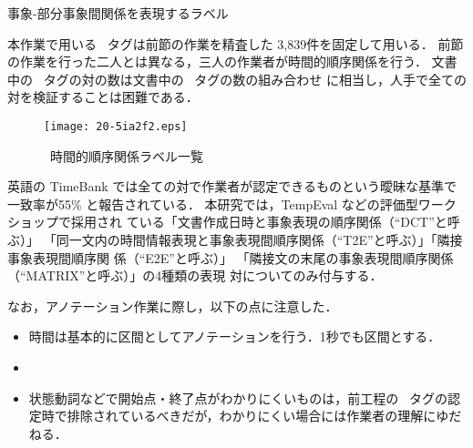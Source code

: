\documentclass[japanese]{jnlp_1.4}
\newcommand{\modified}[1]{}
\def\timexiii{}
\def\tlink{}
\def\event{}
\def\makeinstance{}
\begin{document}
\begin{table}[t]
\caption{事象-部分事象間関係を表現するラベル}
\label{table:subevent}

\end{table}

\modified{これらの計13+3+1種類のラベルを\timexiii\ タグと \makeinstance\ タグの間，もしくは，
二つの \makeinstance\ タグ間に付与する．}
本作業で用いる \makeinstance\ タグは前節の作業を精査した 3,839件を固定して用いる．
前節の作業を行った二人とは異なる，三人の作業者が時間的順序関係を行う．
文書中の \makeinstance\ タグの対の数は文書中の \makeinstance\ タグの数の組み合わせ
に相当し，人手で全ての対を検証することは困難である．

\begin{figure}[t]
\begin{center}
\texttt{[image: 20-5ia2f2.eps]}
\end{center}
\caption{\tlink\ 時間的順序関係ラベル一覧}
\label{fig:allen}
\end{figure}

英語の TimeBank では\modified{，}全ての対で作業者が認定できるものという曖昧な基準で一致率が55\% と報告されている．
本研究では，TempEval などの評価型ワークショップで採用され
ている「文書作成日時と事象表現の順序関係（``DCT''と呼ぶ）」 
「同一文内の時間情報表現と事象表現間順序関係（``T2E''と呼ぶ）」「隣接事象表現間順序関
  係（``E2E''と呼ぶ）」
「隣接文の末尾の事象表現間順序関係（``MATRIX''と呼ぶ）」の4種類の表現
対についてのみ付与する．

\modified{英語の TimeBank は，どの表現対に関係を付与するかというのは作業者にゆだねられて
いる．
一方，本研究では4種類の表現対について必ず何らかの関係を付与することとし，
現実世界の事象と仮想世界の事象間，もしくは，二仮想世界の事象間などの場合で時間的
順序関係が規定できない場合に `vague' を付与することとしている．
本作業の基準では4種類の表現対のうち ``DCT'', ``E2E'', ``MATRIX'' の3種類につい
て複数の連結可能な単純道をグラフ上確保しており，基本的にアノテーションは連結グラ
フを構成する．このグラフ中 `vague'の関係が切断辺となる場合，分離された部分グラフ
は二つの異なる可能世界（実世界-架空世界，異なる二架空世界）を明示的に表現する．}

なお，アノテーション作業に際し，以下の点に注意した．
\begin{itemize}
\item 時間は基本的に区間としてアノテーションを行う．1秒でも区間とする．
\item \modified{事象は瞬間動詞については点（長さ0の区間）とし，それ以外の表現は区間とする．}
\item 状態動詞などで開始点・終了点がわかりにくいものは，前工程の \event\ タグの認定時で排除されているべきだが，わかりにくい場合には作業者の理解にゆだねる．
\end{itemize}
\end{document}
